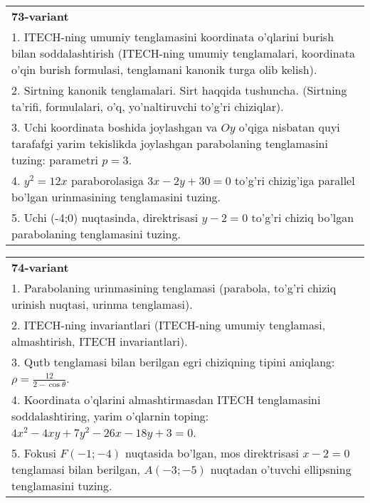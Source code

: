 \documentclass{article}
\begin{document}
\begin{tabular}{m{17cm}}
\textbf{73-variant}\\
1. ITECH-ning umumiy tenglamasini koordinata o'qlarini burish bilan soddalashtirish (ITECH-ning umumiy tenglamalari, koordinata o'qin burish formulasi, tenglamani kanonik turga olib kelish).\\

2. Sirtning kanonik tenglamalari. Sirt haqqida tushuncha. (Sirtning ta'rifi, formulalari, o'q, yo'naltiruvchi to'g'ri chiziqlar).\\

3. Uchi koordinata boshida joylashgan va $Oy$ o'qiga nisbatan quyi tarafafgi yarim tekislikda joylashgan parabolaning tenglamasini tuzing: parametri $p=3$.\\

4. $y^{2} = 12x$ paraborolasiga $3x - 2y + 30 = 0$ to'g'ri chizig'iga parallel bo'lgan urinmasining tenglamasini tuzing.  \\

5. Uchi (-4;0) nuqtasinda, direktrisasi $y - 2 = 0$ to'g'ri chiziq bo'lgan parabolaning tenglamasini tuzing.
\end{tabular}
\vspace{1cm}


\begin{tabular}{m{17cm}}
\textbf{74-variant}\\
1. Parabolaning urinmasining tenglamasi (parabola, to'g'ri chiziq urinish nuqtasi, urinma tenglamasi).\\

2. ITECH-ning invariantlari (ITECH-ning umumiy tenglamasi, almashtirish, ITECH invariantlari).\\

3. Qutb tenglamasi bilan berilgan egri chiziqning tipini aniqlang: $\rho=\frac{12}{2-\cos\theta}$.\\

4. Koordinata o'qlarini almashtirmasdan ITECH tenglamasini soddalashtiring, yarim o'qlarnin toping: $4x^{2} - 4xy + 7y^{2} - 26x - 18y + 3 = 0$.\\

5. Fokusi $F( - 1; - 4)$ nuqtasida bo'lgan, mos direktrisasi $x - 2 = 0$ tenglamasi bilan berilgan, $A( - 3; - 5)$ nuqtadan o'tuvchi ellipsning tenglamasini tuzing.  
\end{tabular}
\vspace{1cm}
\end{document}
